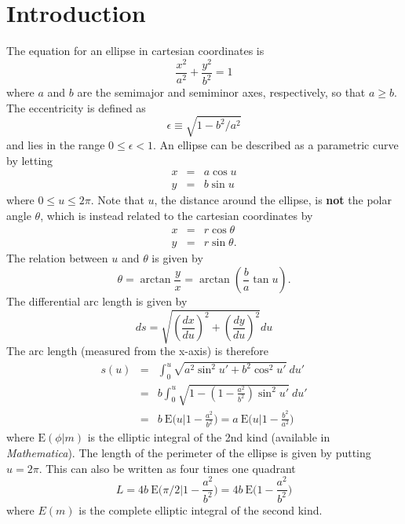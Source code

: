 \documentclass[aps,pra,showpacs,twocolumn]{revtex4}
\begin{document}
\section{Introduction}
The equation for an ellipse in cartesian coordinates is
\begin{equation}
\frac{x^2}{a^2}+\frac{y^2}{b^2}=1
\end{equation}
where $a$ and $b$ are the semimajor and semiminor axes, respectively, so that $a \ge b$. The eccentricity is defined as 
\begin{equation}
\epsilon \equiv \sqrt{1-b^2/a^2} 
\end{equation}
and lies in the range $0 \le \epsilon <1$.
An ellipse can be described as a parametric curve by letting
\begin{eqnarray}
x & = & a \cos u \\
y & = & b \sin u
\end{eqnarray}
where $0 \le u \le 2 \pi $. Note that $u$, the distance around the ellipse, is \textbf{not} the polar angle $\theta$, which is instead related to the cartesian coordinates by
\begin{eqnarray}
x & = & r \cos \theta \\
y & = & r \sin \theta . 
\end{eqnarray}
The relation between $u$ and $\theta$ is given by
\begin{equation}
 \theta = \arctan \frac{y}{x} = \arctan \left( \frac{b}{a} \tan u \right) .
\end{equation}
The differential arc length is given by
\begin{equation}
ds = \sqrt{\left( \frac{dx}{du}\right)^2+\left( \frac{dy}{du}\right)^2} du
\end{equation}
The arc length (measured from the x-axis) is therefore 
\begin{eqnarray}
s(u) & = & \int_{0}^{u} \sqrt{a^2 \sin^{2} u' + b^2 \cos^{2} u' }  \ du' \\
& = & b \int_{0}^{u} \sqrt{1- \left( 1- \frac{a^2}{b^2} \right) \sin^{2} u'  }  \ du' \\
& = & b \  \mathrm{E} \bigg( u  \bigg \vert 1- \frac{a^2}{b^2} \bigg) = a \  \mathrm{E} \bigg( u  \bigg \vert 1- \frac{b^2}{a^2} \bigg)
\end{eqnarray}
where $\mathrm{E} (\phi \vert  m)$ is the elliptic integral of the 2nd kind (available in \textit{Mathematica}). The length of the perimeter of the ellipse is given by putting $u=2 \pi$. This can also be written as four times one quadrant
\begin{equation}
L= 4 b \  \mathrm{E} \bigg( \pi/2  \bigg \vert 1- \frac{a^2}{b^2} \bigg) = 4 b \  \mathrm{E} \bigg(  1- \frac{a^2}{b^2} \bigg)
\end{equation}
where $E(m)$ is the complete elliptic integral of the second kind.
\end{document}
